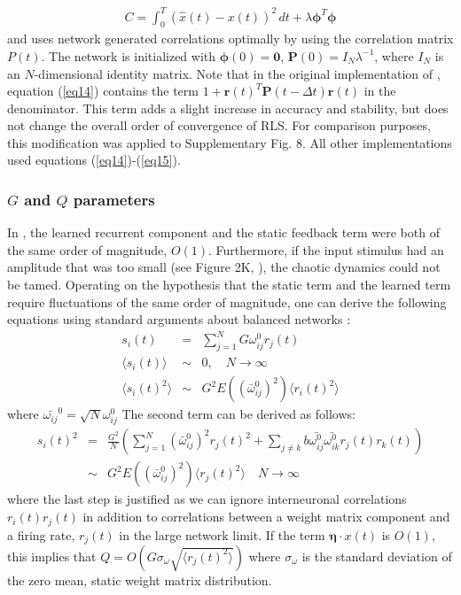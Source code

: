 \documentclass[11pt]{article} %
\begin{document}
\begin{eqnarray}
C = \int_0^T(\hat{x}(t)-x(t))^2\,dt + \lambda \bm{\phi}^T \bm{\phi}  
\end{eqnarray}
and uses network generated correlations optimally by using the correlation matrix $P(t)$.  
The network is initialized with $\bm{\phi}(0) = \bm 0$, $\bm P(0) = I_N\lambda^{-1}$, where $I_N$ is an $N$-dimensional identity matrix.  Note that in the original implementation of \cite{FORCE1}, equation (\ref{eq14}) contains the term $1+\bm r(t)^T \bm P(t-\Delta t) \bm r(t)$ in the denominator.  This term adds a slight increase in accuracy and stability, but does not change the overall order of convergence of RLS.  For comparison purposes, this modification was applied to Supplementary Fig. 8.  All other implementations used equations (\ref{eq14})-(\ref{eq15}).   

\subsubsection*{$G$ and $Q$ parameters}  

In \cite{FORCE1}, the learned recurrent component and the static feedback term were both of the same order of magnitude, $O(1)$.  Furthermore, if the input stimulus had an amplitude that was too small (see Figure 2K, \cite{FORCE1}), the chaotic dynamics could not be tamed.  Operating on the hypothesis that the static term and the learned term require fluctuations of the same order of magnitude, one can derive the following equations using standard arguments about balanced networks \cite{sompo1}:
\begin{eqnarray}
s_i(t)&=&\sum_{j=1}^N G\omega_{ij}^0 r_j(t) \\
\langle s_i(t) \rangle &\sim& 0, \quad N\rightarrow \infty\\
\langle s_i(t)^2\rangle & \sim & G^2 E((\bar{\omega}_{ij}^0)^2) \langle r_i(t)^2\rangle 
\end{eqnarray}
where $\bar{\omega_{ij}}^0 = \sqrt{N} \omega_{ij}^0$
The second term can be derived as follows:
\begin{eqnarray}
s_i(t)^2 &=&\frac{ G^2}{N}\left( \sum_{j=1}^N (\bar{\omega}_{ij}^0)^2 r_j(t)^2 + \sum_{j\neq k}b\bar{\omega_{ij}^0}\bar{\omega_{ik}^0} r_j(t)r_k(t)   \right)\\
&\sim & {G^2} E((\bar{\omega}^0_{ij})^2)\langle r_{j}(t)^2\rangle \quad N\rightarrow \infty  
\end{eqnarray}
where the last step is justified as we can ignore interneuronal correlations $r_i(t)r_j(t)$ in addition to correlations between a weight matrix component and a firing rate, $r_j(t)$ in the large network limit.   If the term $\bm \eta \cdot x(t)$ is $O(1)$, this implies that $Q = O({G} \sigma_{\omega} \sqrt{\langle r_{j}(t)^2\rangle})$ where $\sigma_\omega$ is the standard deviation of the zero mean, static weight matrix distribution. 
\end{document}
